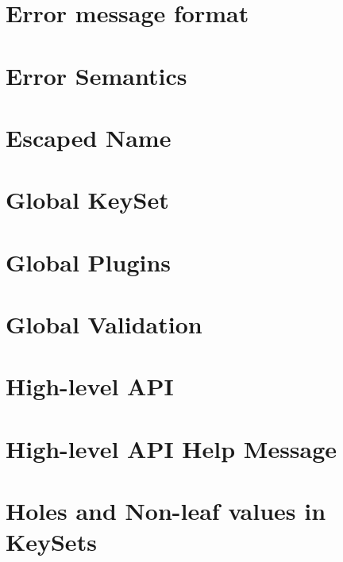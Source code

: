 \documentclass[twoside]{book}
\newcommand{\+}{\discretionary{\mbox{\scriptsize$\hookleftarrow$}}{}{}}
\begin{document}
\chapter{Error message format}
\label{doc_decisions_error_message_format_md}

\chapter{Error Semantics}
\label{doc_decisions_error_semantics_md}

\chapter{Escaped Name}
\label{doc_decisions_escaped_name_md}

\chapter{Global Key\+Set}
\label{doc_decisions_global_keyset_md}

\chapter{Global Plugins}
\label{doc_decisions_global_plugins_md}

\chapter{Global Validation}
\label{doc_decisions_global_validation_md}

\chapter{High-\/level A\+PI}
\label{doc_decisions_high_level_api_md}

\chapter{High-\/level A\+PI Help Message}
\label{doc_decisions_highlevel_help_message_md}

\chapter{Holes and Non-\/leaf values in Key\+Sets}
\label{doc_decisions_holes_md}

\end{document}
